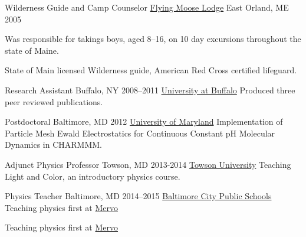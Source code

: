 


\begin{cventries}
  \cventry
    {Wilderness Guide and Camp Counselor} %
    {\href{www.flyingmooselodge.com}{Flying Moose Lodge}} %
    {East Orland, ME} %
    {2005} %
    {
    \begin{cvitems}
      \item {Was responsible for takings boys, aged 8--16, on 10 day excursions throughout the state of Maine.}
      \item {State of Main licensed Wilderness guide, American Red Cross certified lifeguard.}
    \end{cvitems}
    }

  \cventry
    {Research Assistant}
    {Buffalo, NY}
    {2008--2011}
    {\href{www.buffalo.edu}{University at Buffalo}}
	{Produced three peer reviewed publications.}


\cventry
    {Postdoctoral}
    {Baltimore, MD}
    {2012}
    {\href{www.umaryland.edu}{University of Maryland}}
    {Implementation of Particle Mesh Ewald Electrostatics for Continuous Constant pH Molecular Dynamics in CHARMMM.} %

\cventry
    {Adjunct Physics Professor}
    {Towson, MD}
    {2013-2014}
    {\href{www.towson.edu}{Towson University}}
    {Teaching Light and Color, an introductory physics course.}

\cventry
    {Physics Teacher}
    {Baltimore, MD}
    {2014--2015}
    {\href{http://www.baltimorecityschools.org/}{Baltimore City Public Schools}}
    {Teaching physics first at \href{http://mervo.org}{Mervo}}
    \begin{cvitems}
       \item {Teaching physics first at \href{http://mervo.org}{Mervo}}
    \end{cvitems}


\end{cventries}
